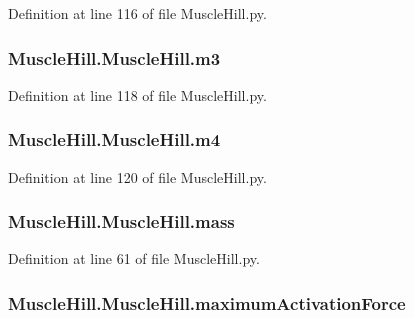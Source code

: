 Definition at line 116 of file Muscle\+Hill.\+py.

\subsubsection[{\texorpdfstring{m3}{m3}}]{\setlength{\rightskip}{0pt plus 5cm}Muscle\+Hill.\+Muscle\+Hill.\+m3}\hypertarget{class_muscle_hill_1_1_muscle_hill_a99cd4e42b58f62f0868b45cb2fff34e5}{}\label{class_muscle_hill_1_1_muscle_hill_a99cd4e42b58f62f0868b45cb2fff34e5}


Definition at line 118 of file Muscle\+Hill.\+py.

\subsubsection[{\texorpdfstring{m4}{m4}}]{\setlength{\rightskip}{0pt plus 5cm}Muscle\+Hill.\+Muscle\+Hill.\+m4}\hypertarget{class_muscle_hill_1_1_muscle_hill_ad72ce2dfd21979a469ea11a2cd721527}{}\label{class_muscle_hill_1_1_muscle_hill_ad72ce2dfd21979a469ea11a2cd721527}


Definition at line 120 of file Muscle\+Hill.\+py.

\subsubsection[{\texorpdfstring{mass}{mass}}]{\setlength{\rightskip}{0pt plus 5cm}Muscle\+Hill.\+Muscle\+Hill.\+mass}\hypertarget{class_muscle_hill_1_1_muscle_hill_a5eab770f1108fc15db3effef9d0e58a6}{}\label{class_muscle_hill_1_1_muscle_hill_a5eab770f1108fc15db3effef9d0e58a6}


Definition at line 61 of file Muscle\+Hill.\+py.

\subsubsection[{\texorpdfstring{maximum\+Activation\+Force}{maximumActivationForce}}]{\setlength{\rightskip}{0pt plus 5cm}Muscle\+Hill.\+Muscle\+Hill.\+maximum\+Activation\+Force}\hypertarget{class_muscle_hill_1_1_muscle_hill_af77dc4d25fcba310c45da4e6731cfd19}{}\label{class_muscle_hill_1_1_muscle_hill_af77dc4d25fcba310c45da4e6731cfd19}


